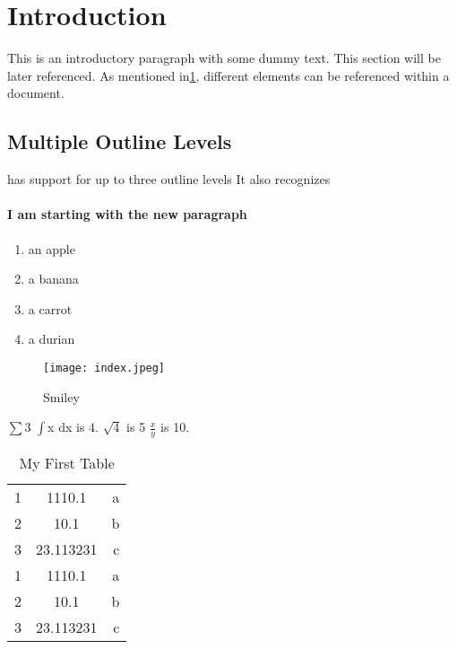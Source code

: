 \documentclass{article}
\begin{document}
\section{Introduction}\label{Intro}
This is an introductory paragraph with some dummy text. This section 
will be later referenced. As mentioned in\ref{Intro}, different elements can be referenced within a document.

\subsection{Multiple Outline Levels}
has support for up to three outline levels It also recognizes 
\paragraph{I am starting with the new paragraph}

\begin{enumerate}
\item an apple
\item a banana
\item a carrot
\item a durian
\end{enumerate}
\begin{figure}
\texttt{[image: index.jpeg]}
\caption{Smiley}
\end{figure}
$\sum$3
$\int$x dx is 4.
$\sqrt{4}$ is 5
$\frac{x}{y}$ is 10.
\begin{table}
  \caption{My First Table}
  \begin{tabular}{l|c|r}
      \hline
      1 & 1110.1 & a\\
      2 & 10.1 & b\\
      3 & 23.113231 & c\\
      \hline
      1 & 1110.1 & a\\
      2 & 10.1 & b\\
      3 & 23.113231 & c\\
    \end{tabular}
 
\end{table}
\end{document}
